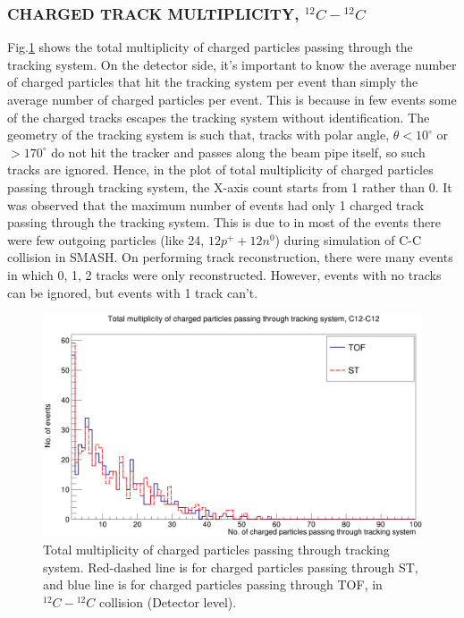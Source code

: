 \documentclass[12pt, twocolumn]{article}
\begin{document}
\subsubsection{CHARGED TRACK MULTIPLICITY, $^{12}C-{^{12}C}$}
\label{CHARGED TRACK MULTIPLICITY, C12-C12}
Fig.\ref{Total multiplicity of charged particles passing through tracking system. Red-dashed line is for charged particles passing through ST, and blue line is for charged particles passing through TOF, in C12-C12 collision (Detector stage).} shows the total multiplicity of charged particles passing through the tracking system. On the detector side, it's important to know the average number of charged particles that hit the tracking system per event than simply the average number of charged particles per event. This is because in few events some of the charged tracks escapes the tracking system without identification. The geometry of the tracking system is such that, tracks with polar angle, $\theta < 10^{\circ}$ or $> 170^{\circ}$ do not hit the tracker and passes along the beam pipe itself, so such tracks are ignored. Hence, in the plot of total multiplicity of charged particles passing through tracking system, the X-axis count starts from 1 rather than 0. It was observed that the maximum number of events had only 1 charged track passing through the tracking system. This is due to in most of the events there were few outgoing particles (like 24, $12 p^{+} + 12 n^{0}$) during simulation of C-C collision in SMASH. On performing track reconstruction, there were many events in which 0, 1, 2 tracks were only reconstructed. However, events with no tracks can be ignored, but events with 1 track can't.

\begin{figure}[h]
\centering
\includegraphics[scale=0.14]{Detector_TotalMultiplicity_C12.png}
\caption{Total multiplicity of charged particles passing through tracking system. Red-dashed line is for charged particles passing through ST, and blue line is for charged particles passing through TOF, in $^{12}C-{^{12}C}$ collision (Detector level).}
\label{Total multiplicity of charged particles passing through tracking system. Red-dashed line is for charged particles passing through ST, and blue line is for charged particles passing through TOF, in C12-C12 collision (Detector stage).}
\end{figure}
\end{document}
